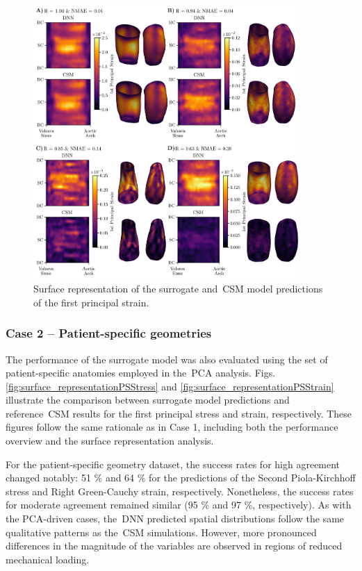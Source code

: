 \documentclass[a4paper,fleqn]{cas-sc}
\begin{document}
    \begin{figure}
      \centering
      \includegraphics[width=0.9\textwidth]{fig5}
      \caption{Surface representation of the surrogate and~\gls{CSM} model predictions of the first principal strain.}
      \label{fig:surface_representationStrain}
    \end{figure}

  \subsubsection{Case 2 -- Patient-specific geometries}
    The performance of the surrogate model was also evaluated using the set of patient-specific anatomies employed in the~\gls{PCA} analysis. Figs. \ref{fig:surface_representationPSStress} and \ref{fig:surface_representationPSStrain} illustrate the comparison between surrogate model predictions and reference~\gls{CSM} results for the first principal stress and strain, respectively. These figures follow the same rationale as in Case 1, including both the performance overview and the surface representation analysis. 

    For the patient-specific geometry dataset, the success rates for high agreement changed notably: 51 \% and 64 \% for the predictions of the Second Piola-Kirchhoff stress and Right Green-Cauchy strain, respectively. Nonetheless, the success rates for moderate agreement remained similar (95 \% and 97 \%, respectively). As with the PCA-driven cases, the~\gls{DNN} predicted spatial distributions follow the same qualitative patterns as the~\gls{CSM} simulations. However, more pronounced differences in the magnitude of the variables are observed in regions of reduced mechanical loading.
\end{document}
